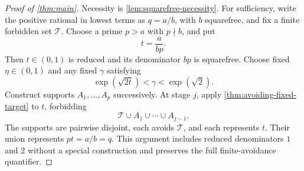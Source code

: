 \begin{proof}[Proof of \cref{thm:main}]
Necessity is \cref{lem:squarefree-necessity}. For sufficiency, write the positive rational in lowest terms as $q=a/b$, with $b$ squarefree, and fix a finite forbidden set $\mathcal T$. Choose a prime $p>a$ with $p\nmid b$, and put
\[
 t=\frac{a}{bp}.
\]
Then $t\in(0,1)$ is reduced and its denominator $bp$ is squarefree. Choose fixed $\eta\in(0,1)$ and any fixed $\gamma$ satisfying
\[
 \exp(\sqrt{2t})<\gamma<\exp(\sqrt2).
\]
Construct supports $A_1,\ldots,A_p$ successively. At stage $j$, apply \cref{thm:avoiding-fixed-target} to $t$, forbidding
\[
 \mathcal T\cup A_1\cup\cdots\cup A_{j-1}.
\]
The supports are pairwise disjoint, each avoids $\mathcal T$, and each represents $t$. Their union represents $pt=a/b=q$. This argument includes reduced denominators $1$ and $2$ without a special construction and preserves the full finite-avoidance quantifier.
\end{proof}

